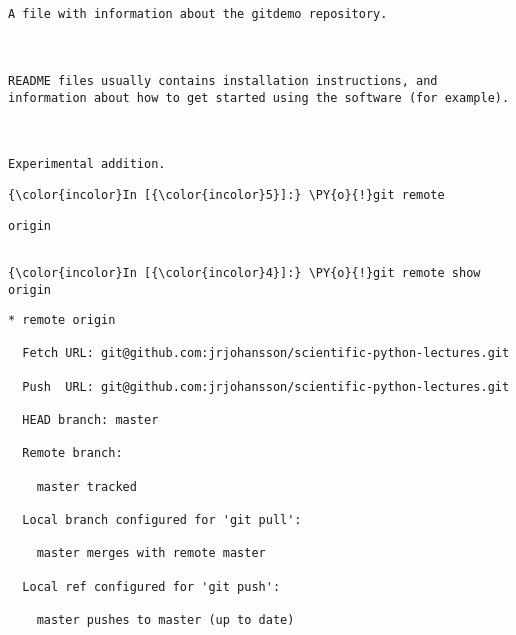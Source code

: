     \begin{Verbatim}[commandchars=\\\{\}]


A file with information about the gitdemo repository.



README files usually contains installation instructions, and information about how to get started using the software (for example).



Experimental addition.
    \end{Verbatim}





    \begin{Verbatim}[commandchars=\\\{\}]
{\color{incolor}In [{\color{incolor}5}]:} \PY{o}{!}git remote
\end{Verbatim}

    \begin{Verbatim}[commandchars=\\\{\}]
origin


    \end{Verbatim}

    \begin{Verbatim}[commandchars=\\\{\}]
{\color{incolor}In [{\color{incolor}4}]:} \PY{o}{!}git remote show origin
\end{Verbatim}

    \begin{Verbatim}[commandchars=\\\{\}]
* remote origin

  Fetch URL: git@github.com:jrjohansson/scientific-python-lectures.git

  Push  URL: git@github.com:jrjohansson/scientific-python-lectures.git

  HEAD branch: master

  Remote branch:

    master tracked

  Local branch configured for 'git pull':

    master merges with remote master

  Local ref configured for 'git push':

    master pushes to master (up to date)


    \end{Verbatim}





